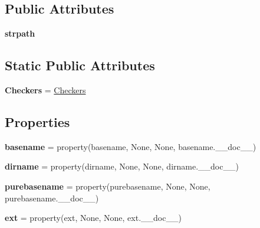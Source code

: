 \subsection*{Public Attributes}
\begin{DoxyCompactItemize}
\item 
\mbox{\label{classpy_1_1__path_1_1common_1_1_path_base_a3fb9f130e6ef6f2f33e0b11f2fe77f42}} 
{\bfseries strpath}
\end{DoxyCompactItemize}
\subsection*{Static Public Attributes}
\begin{DoxyCompactItemize}
\item 
\mbox{\label{classpy_1_1__path_1_1common_1_1_path_base_a061ac831d33edda76001578631794d92}} 
{\bfseries Checkers} = \hyperlink{classpy_1_1__path_1_1common_1_1_checkers}{Checkers}
\end{DoxyCompactItemize}
\subsection*{Properties}
\begin{DoxyCompactItemize}
\item 
\mbox{\label{classpy_1_1__path_1_1common_1_1_path_base_aa05eff587c58bab8b58d820a9c36219b}} 
{\bfseries basename} = property(basename, None, None, basename.\+\_\+\+\_\+doc\+\_\+\+\_\+)
\item 
\mbox{\label{classpy_1_1__path_1_1common_1_1_path_base_ab099f2db83c3e5f19346abf322501bf7}} 
{\bfseries dirname} = property(dirname, None, None, dirname.\+\_\+\+\_\+doc\+\_\+\+\_\+)
\item 
\mbox{\label{classpy_1_1__path_1_1common_1_1_path_base_a14c0f0d89431a463c979421dfc194715}} 
{\bfseries purebasename} = property(purebasename, None, None, purebasename.\+\_\+\+\_\+doc\+\_\+\+\_\+)
\item 
\mbox{\label{classpy_1_1__path_1_1common_1_1_path_base_a4544be78eb65ead53158fe3b1aa1a776}} 
{\bfseries ext} = property(ext, None, None, ext.\+\_\+\+\_\+doc\+\_\+\+\_\+)
\end{DoxyCompactItemize}



